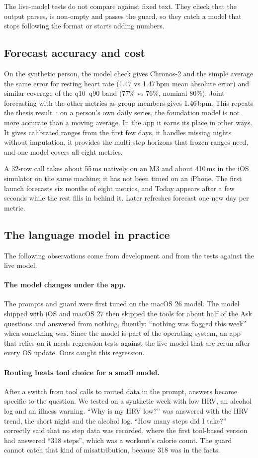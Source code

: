 \documentclass[11pt,a4paper]{article}
\begin{document}
The live-model tests do not compare against fixed text. They check that the output parses, is non-empty and passes the guard, so they catch a model that stops following the format or starts adding numbers.

\subsection{Forecast accuracy and cost}
On the synthetic person, the model check gives Chronos-2 and the simple average the same error for resting heart rate (1.47 vs 1.47\,bpm mean absolute error) and similar coverage of the q10--q90 band (77\% vs 76\%, nominal 80\%). Joint forecasting with the other metrics as group members gives 1.46\,bpm. This repeats the thesis result~\cite{jankovikj2026chronos}: on a person's own daily series, the foundation model is not more accurate than a moving average. In the app it earns its place in other ways. It gives calibrated ranges from the first few days, it handles missing nights without imputation, it provides the multi-step horizons that frozen ranges need, and one model covers all eight metrics.

A 32-row call takes about 55\,ms natively on an M3 and about 410\,ms in the iOS simulator on the same machine; it has not been timed on an iPhone. The first launch forecasts six months of eight metrics, and Today appears after a few seconds while the rest fills in behind it. Later refreshes forecast one new day per metric.

\subsection{The language model in practice}
The following observations come from development and from the tests against the live model.

\paragraph{The model changes under the app.} The prompts and guard were first tuned on the macOS 26 model. The model shipped with iOS and macOS 27 then skipped the tools for about half of the Ask questions and answered from nothing, fluently: ``nothing was flagged this week'' when something was. Since the model is part of the operating system, an app that relies on it needs regression tests against the live model that are rerun after every OS update. Ours caught this regression.

\paragraph{Routing beats tool choice for a small model.} After a switch from tool calls to routed data in the prompt, answers became specific to the question. We tested on a synthetic week with low HRV, an alcohol log and an illness warning. ``Why is my HRV low?'' was answered with the HRV trend, the short night and the alcohol log. ``How many steps did I take?'' correctly said that no step data was recorded, where the first tool-based version had answered ``318 steps'', which was a workout's calorie count. The guard cannot catch that kind of misattribution, because 318 was in the facts.
\end{document}
